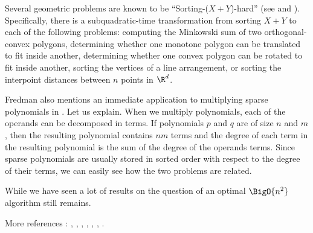 Several geometric problems are known to be ``Sorting-($X + Y$)-hard'' (see
\cite{barrera1996finding} and \cite{barequet2001polygon}). Specifically, there
is a subquadratic-time transformation from sorting $X + Y$ to each of the
following problems: computing the Minkowski sum of two orthogonal-convex
polygons, determining whether one monotone polygon can be translated to fit
inside another, determining whether one convex polygon can be rotated to fit
inside another, sorting the vertices of a line arrangement, or sorting the
interpoint distances between $n$ points in $\R^d$.

Fredman also mentions an immediate application to multiplying sparse
polynomials in \cite{fredman1976good}. Let us explain. When we multiply
polynomials, each of the operands can be decomposed in terms. If polynomials
$p$ and $q$ are of size $n$ and $m$, then the resulting polynomial contains
$nm$ terms and the degree of each term in the resulting polynomial is the sum
of the degree of the operands terms. Since sparse polynomials are usually
stored in sorted order with respect to the degree of their terms, we can easily
see how the two problems are related.

While we have seen a lot of results on  the question of an
optimal $\BigO{n^2}$ algorithm still remains.

More references : \cite{orourke:2012:sortxy}, \cite{kahnkim1},
\cite{dietzfelbinger1989lower}, \cite{steiger1995pseudo},
\cite{lambert1990sorting}, \cite{erickson1997lower},
\cite{bremner2012necklaces}.



